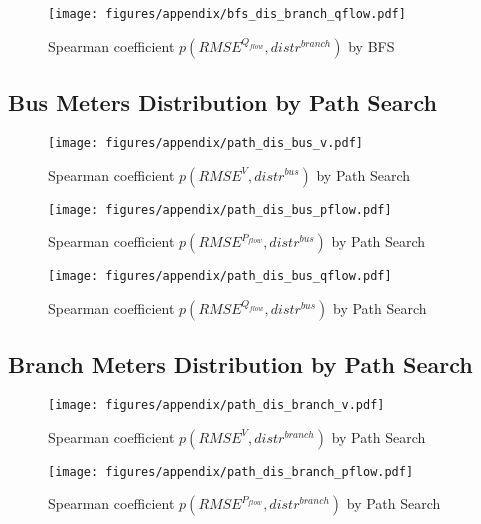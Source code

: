 \begin{appendices}
    \begin{figure}[!htb]
        \centering
        \texttt{[image: figures/appendix/bfs\_dis\_branch\_qflow.pdf]}
        \caption{Spearman coefficient $p(RMSE^{Q_{flow}},distr^{branch})$ by BFS}
        \label{fig:app_db_branch_qflow}
    \end{figure}
\FloatBarrier    
    
\subsection{Bus Meters Distribution by Path Search}    
    
    \begin{figure}[!h]
        \centering
        \texttt{[image: figures/appendix/path\_dis\_bus\_v.pdf]}
        \caption{Spearman coefficient $p(RMSE^V,distr^{bus})$ by Path Search}
        \label{fig:app_db_bus_v_path}
    \end{figure}
    
    \begin{figure}[!h]
        \centering
        \texttt{[image: figures/appendix/path\_dis\_bus\_pflow.pdf]}
        \caption{Spearman coefficient $p(RMSE^{P_{flow}},distr^{bus})$ by Path Search}
        \label{fig:app_db_bus_pflow_path}
    \end{figure}
    
    \begin{figure}[!h]
        \centering
        \texttt{[image: figures/appendix/path\_dis\_bus\_qflow.pdf]}
        \caption{Spearman coefficient $p(RMSE^{Q_{flow}},distr^{bus})$ by Path Search}
        \label{fig:app_db_bus_qflow_path}
    \end{figure}
\FloatBarrier    
    
\subsection{Branch Meters Distribution by Path Search} 
    \begin{figure}[!h]
        \centering
        \texttt{[image: figures/appendix/path\_dis\_branch\_v.pdf]}
        \caption{Spearman coefficient $p(RMSE^V,distr^{branch})$ by Path Search}
        \label{fig:app_db_branch_v_path}
    \end{figure}
    
    \begin{figure}[!h]
        \centering
        \texttt{[image: figures/appendix/path\_dis\_branch\_pflow.pdf]}
        \caption{Spearman coefficient $p(RMSE^{P_{flow}},distr^{branch})$ by Path Search}
        \label{fig:app_db_branch_pflow_path}
    \end{figure}
    

\end{appendices}
